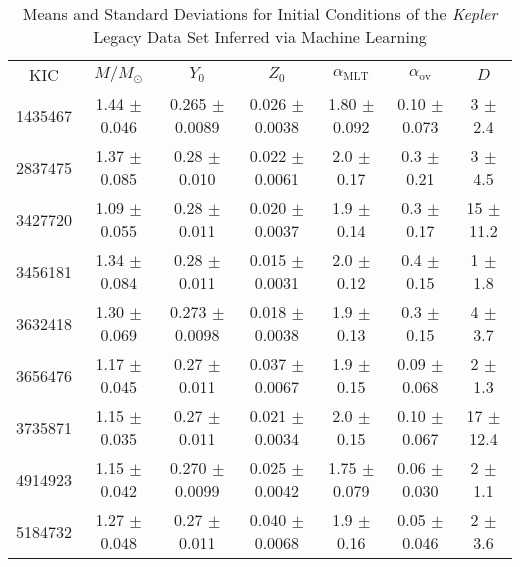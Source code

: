 \begin{table*}
    \centering
    \caption{Means and Standard Deviations for Initial Conditions of the \emph{Kepler} Legacy Data Set Inferred via Machine Learning}
    \label{tab:2}
    \fontsize{8}{9.5}\selectfont%
    \begin{tabular}{c|cccccc}
        \hline\noalign{\smallskip}
        KIC & $M/M_\odot$ & $Y_0$ & $Z_0$ & $\alpha_{\mathrm{MLT}}$ & $\alpha_{\mathrm{ov}}$ & $D$ \\
        \noalign{\smallskip}\hline\noalign{\smallskip}
1435467  &        1.44   $\pm$  0.046    &        0.265  $\pm$  0.0089   &        0.026  $\pm$  0.0038   &        1.80   $\pm$  0.092    &        0.10   $\pm$  0.073    &        3      $\pm$  2.4      \\
2837475  &        1.37   $\pm$  0.085    &        0.28   $\pm$  0.010    &        0.022  $\pm$  0.0061   &        2.0    $\pm$  0.17     &        0.3    $\pm$  0.21     &        3      $\pm$  4.5      \\
3427720  &        1.09   $\pm$  0.055    &        0.28   $\pm$  0.011    &        0.020  $\pm$  0.0037   &        1.9    $\pm$  0.14     &        0.3    $\pm$  0.17     &       15      $\pm$ 11.2      \\
3456181  &        1.34   $\pm$  0.084    &        0.28   $\pm$  0.011    &        0.015  $\pm$  0.0031   &        2.0    $\pm$  0.12     &        0.4    $\pm$  0.15     &        1      $\pm$  1.8      \\
3632418  &        1.30   $\pm$  0.069    &        0.273  $\pm$  0.0098   &        0.018  $\pm$  0.0038   &        1.9    $\pm$  0.13     &        0.3    $\pm$  0.15     &        4      $\pm$  3.7      \\
3656476  &        1.17   $\pm$  0.045    &        0.27   $\pm$  0.011    &        0.037  $\pm$  0.0067   &        1.9    $\pm$  0.15     &        0.09   $\pm$  0.068    &        2      $\pm$  1.3      \\
3735871  &        1.15   $\pm$  0.035    &        0.27   $\pm$  0.011    &        0.021  $\pm$  0.0034   &        2.0    $\pm$  0.15     &        0.10   $\pm$  0.067    &       17      $\pm$ 12.4      \\
4914923  &        1.15   $\pm$  0.042    &        0.270  $\pm$  0.0099   &        0.025  $\pm$  0.0042   &        1.75   $\pm$  0.079    &        0.06   $\pm$  0.030    &        2      $\pm$  1.1      \\
5184732  &        1.27   $\pm$  0.048    &        0.27   $\pm$  0.011    &        0.040  $\pm$  0.0068   &        1.9    $\pm$  0.16     &        0.05   $\pm$  0.046    &        2      $\pm$  3.6      \\

\end{tabular}
\end{table*}
